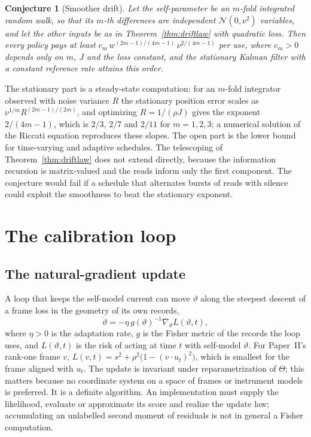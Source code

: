 \documentclass[12pt]{article}
\newtheorem{conjecture}[theorem]{Conjecture}
\theoremstyle{definition}
\begin{document}
\begin{conjecture}[Smoother drift]
\label{conj:smooth}
Let the self-parameter be an $m$-fold integrated random walk, so that its $m$-th differences are independent $\mathcal N(0,\nu^2)$ variables, and let the other inputs be as in Theorem~\ref{thm:driftlaw} with quadratic loss. Then every policy pays at least $c_m\,w^{(2m-1)/(4m-1)}\,\nu^{2/(4m-1)}$ per use, where $c_m>0$ depends only on $m$, $J$ and the loss constant, and the stationary Kalman filter with a constant reference rate attains this order.
\end{conjecture}

The stationary part is a steady-state computation: for an $m$-fold integrator observed with noise variance $R$ the stationary position error scales as $\nu^{1/m}R^{(2m-1)/(2m)}$, and optimizing $R=1/(\rho J)$ gives the exponent $2/(4m-1)$, which is $2/3$, $2/7$ and $2/11$ for $m=1,2,3$; a numerical solution of the Riccati equation reproduces these slopes. The open part is the lower bound for time-varying and adaptive schedules. The telescoping of Theorem~\ref{thm:driftlaw} does not extend directly, because the information recursion is matrix-valued and the reads inform only the first component. The conjecture would fail if a schedule that alternates bursts of reads with silence could exploit the smoothness to beat the stationary exponent.

\section{The calibration loop}
\label{sec:loop}

\subsection{The natural-gradient update}
\label{subsec:update_law}

A loop that keeps the self-model current can move $\vartheta$ along the steepest descent of a frame loss in the geometry of its own records,
\begin{equation}
\label{eq:update_law}
\dot\vartheta=-\eta\,g(\vartheta)^{-1}\nabla_\vartheta L(\vartheta,t),
\end{equation}
where $\eta>0$ is the adaptation rate, $g$ is the Fisher metric of the records the loop uses, and $L(\vartheta,t)$ is the risk of acting at time $t$ with self-model $\vartheta$. For Paper~II's rank-one frame $v$, $L(v,t)=s^2+\rho^2\bigl(1-(v\cdot u_t)^2\bigr)$, which is smallest for the frame aligned with $u_t$. The update is invariant under reparametrization of $\Theta$; this matters because no coordinate system on a space of frames or instrument models is preferred. It is a definite algorithm. An implementation must supply the likelihood, evaluate or approximate its score and realize the update law; accumulating an unlabelled second moment of residuals is not in general a Fisher computation.
\end{document}

